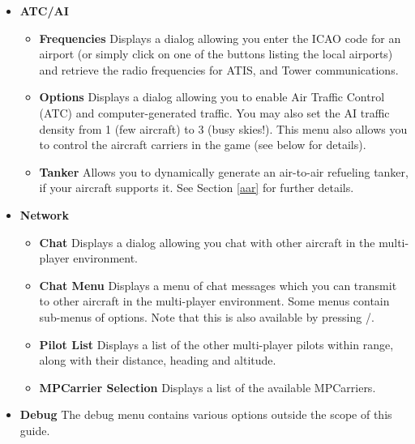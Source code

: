\begin{itemize}
\item \textbf{ATC/AI}
 \begin{itemize}
  \item \textbf{Frequencies}  Displays a dialog allowing you enter the ICAO code
for an airport
  (or simply click on one of the buttons listing the local airports) and
retrieve the radio
  frequencies for ATIS, and Tower communications.
  \item \textbf{Options}  Displays a dialog allowing you to enable Air Traffic
Control (ATC) and
  computer-generated traffic. You may also set the AI traffic density from 1
(few aircraft) to 3 (busy skies!).
  This menu also allows you to control the aircraft carriers in the game (see
below for details).
  \item \textbf{Tanker}  Allows you to dynamically generate an air-to-air refueling
  tanker, if your aircraft supports it. See Section \ref{aar} for further details.
 \end{itemize}

\item \textbf{Network}
 \begin{itemize}
  \item \textbf{Chat} Displays a dialog allowing you chat with other aircraft in
the multi-player environment. 
  \item \textbf{Chat Menu} Displays a menu of chat messages which you can
  transmit to other aircraft in the multi-player environment. Some menus
  contain sub-menus of options. Note that this is also available by pressing /.
  \item \textbf{Pilot List} Displays a list of the other multi-player pilots 
  within range, along with their distance, heading and altitude.
  \item \textbf{MPCarrier Selection} Displays a list of the available MPCarriers.
\end{itemize}

\item \textbf{Debug} The debug menu contains various options
outside the scope of this guide.


\end{itemize}
